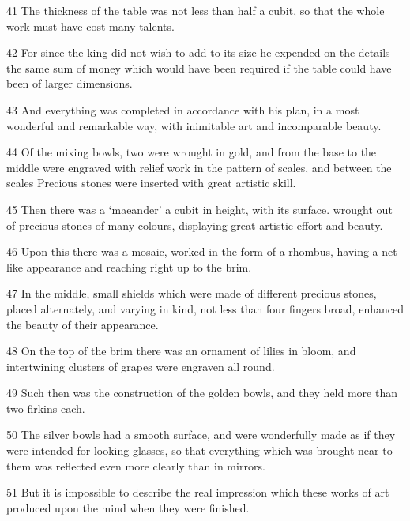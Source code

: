 \par 41 The thickness of the table was not less than half a cubit, so that the whole work must have cost many talents.

\par 42 For since the king did not wish to add to its size he expended on the details the same sum of money which would have been required if the table could have been of larger dimensions.

\par 43 And everything was completed in accordance with his plan, in a most wonderful and remarkable way, with inimitable art and incomparable beauty.

\par 44 Of the mixing bowls, two were wrought in gold, and from the base to the middle were engraved with relief work in the pattern of scales, and between the scales Precious stones were inserted with great artistic skill.

\par 45 Then there was a ‘maeander’ a cubit in height, with its surface. wrought out of precious stones of many colours, displaying great artistic effort and beauty.

\par 46 Upon this there was a mosaic, worked in the form of a rhombus, having a net-like appearance and reaching right up to the brim.

\par 47 In the middle, small shields which were made of different precious stones, placed alternately, and varying in kind, not less than four fingers broad, enhanced the beauty of their appearance.

\par 48 On the top of the brim there was an ornament of lilies in bloom, and intertwining clusters of grapes were engraven all round.

\par 49 Such then was the construction of the golden bowls, and they held more than two firkins each.

\par 50 The silver bowls had a smooth surface, and were wonderfully made as if they were intended for looking-glasses, so that everything which was brought near to them was reflected even more clearly than in mirrors.

\par 51 But it is impossible to describe the real impression which these works of art produced upon the mind when they were finished.

